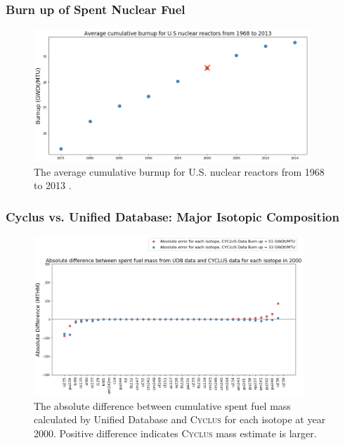 \begin{frame}
    \frametitle{Burn up of Spent Nuclear Fuel}
    \begin{figure}[htbp!]
        \begin{center}
        \includegraphics[height=5cm]{../figures/burn_up_real}
        \end{center}
        \caption{The average cumulative burnup for U.S. nuclear reactors
        from 1968 to 2013 \cite{eia_spent_2015}.}
        \end{figure}
    \end{frame}

\begin{frame}
    \frametitle{Cyclus vs. Unified Database: Major Isotopic Composition}
    \begin{figure}[htbp!]
        \begin{center}
          \includegraphics[height=6cm]{../figures/absolute_diff_2000}
        \end{center}
              \caption{The absolute difference between cumulative spent fuel mass calculated by 
              Unified Database and \textsc{Cyclus} for each isotope at year 2000. Positive difference indicates \textsc{Cyclus}
              mass estimate is larger.}
        \label{fig:totalmass}
      \end{figure}
\end{frame}

